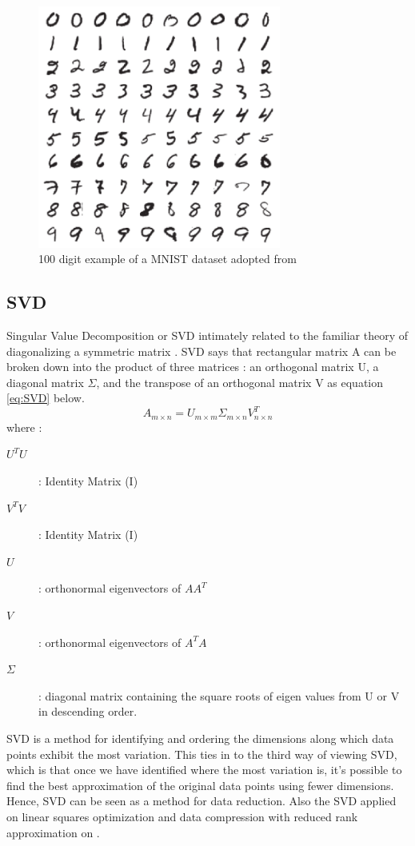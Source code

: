 \documentclass[conference]{IEEEtran}
\begin{document}
\begin{figure}[htbp]
    \centerline{\includegraphics[width=8cm]{100MNIST.png}}
    \caption{100 digit example of a MNIST dataset adopted from \protect\cite{baldominos2019survey} }
    \label{fig:100mnist}
\end{figure}

\subsection{SVD}
Singular Value Decomposition or SVD intimately related to the familiar theory of diagonalizing a symmetric matrix \cite{kalman1996singularly}. 
SVD says that rectangular matrix A can be broken down into the product of three matrices : an orthogonal matrix U, a diagonal matrix $\Sigma$, and the transpose of an orthogonal matrix V as equation \ref{eq:SVD} below.
\begin{equation}
    \label{eq:SVD}
    A_{m \times n} = U_{m\times m} \Sigma_{m\times n} V_{n\times n}^T
\end{equation}
where : 
\begin{description}
    \item[$U^TU$] : Identity Matrix (I)
    \item[$V^TV$] : Identity Matrix (I)
    \item[$U$] : orthonormal eigenvectors of $AA^T$
    \item[$V$] : orthonormal eigenvectors of $A^TA$
    \item[$\Sigma$] : diagonal matrix containing the square roots of eigen values from U or V in descending order.  
\end{description}

SVD is a method for identifying and ordering the dimensions
along which data points exhibit the most variation. This ties in to the third way of viewing
SVD, which is that once we have identified where the most variation is, it’s possible to find
the best approximation of the original data points using fewer dimensions. Hence, SVD can
be seen as a method for data reduction. Also the SVD applied on linear squares optimization and data compression with reduced rank approximation on \cite{kalman1996singularly}.
\end{document}

